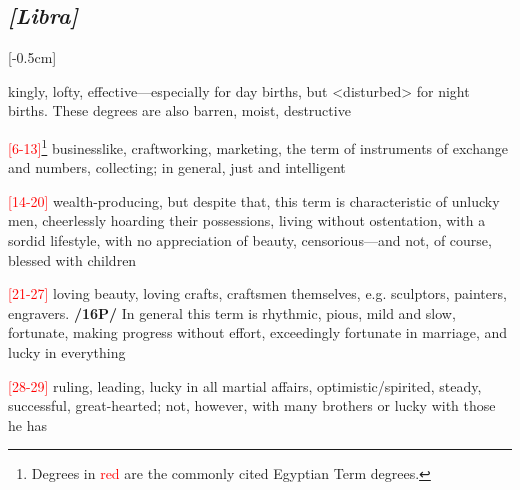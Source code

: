 \subsection{\textit{[Libra]}}
\marginnote{\Libra}[-0.5cm]
\vspace{-1mm}
\begin{description}[labelindent=0em , labelwidth=1em, labelsep=1em, leftmargin =!]
\item[\Saturn]
	[0-5] kingly, lofty, effective—especially for day births, but <disturbed> for night births. These degrees are also barren, moist, destructive
\item[\Mercury]
	[6-10]\textcolor{red}{[6-13]\footnote{Degrees in \textcolor{red}{red} are the commonly cited Egyptian Term degrees.}} businesslike, craftworking, marketing, the term of instruments of exchange and numbers, collecting; in general, just and intelligent	
\item[\Jupiter]
	[11-18]\textcolor{red}{[14-20]} wealth-producing, but
despite that, this term is characteristic of unlucky men, cheerlessly hoarding their possessions, living without ostentation, with a sordid lifestyle, with no appreciation of beauty, censorious—and not, of course, blessed with children	
\item[\Venus]
	[19-25]\textcolor{red}{[21-27]} loving beauty, loving crafts, craftsmen
themselves, e.g. sculptors, painters, engravers. \textbf{/16P/} In general this term is rhythmic, pious, mild and slow, fortunate, making progress without effort, exceedingly fortunate in marriage, and lucky in everything
\item[\Mars]
	[26-29]\textcolor{red}{[28-29]} ruling, leading, lucky in all martial affairs, optimistic/spirited, steady, successful, great-hearted; not, however, with many brothers or lucky with those he has
\end{description}

